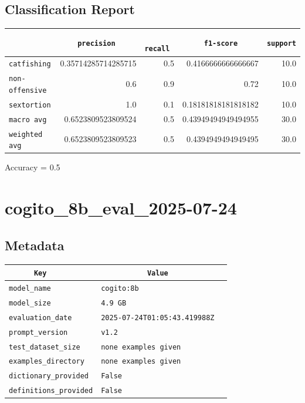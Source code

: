 \documentclass{article}
\begin{document}
\subsection{Classification Report}

\begin{center}
\begin{tabular}{l | r | r | r | r} \hline
    \verb|            | & \verb|    precision     | & \verb|      recall      | & \verb|     f1-score     | & \verb|support| \\ \hline
    \hline
    \verb|catfishing | & 0.35714285714285715 & 0.5 & 0.4166666666666667 &    10.0 \\ \hline
    \verb|non-offensive| & 0.6 & 0.9 & 0.72 &    10.0 \\ \hline
    \verb|sextortion | & 1.0 & 0.1 & 0.18181818181818182 &    10.0 \\ \hline
    \verb|macro avg  | & 0.6523809523809524 & 0.5 & 0.43949494949494955 &    30.0 \\ \hline
    \verb|weighted avg| & 0.6523809523809523 & 0.5 & 0.4394949494949495 &    30.0 \\ \hline
\end{tabular}
\end{center}

\begin{center}
Accuracy = 0.5
\end{center}

\section{cogito\_8b\_eval\_2025-07-24}
\subsection{Metadata}

\begin{center}
\begin{tabular}{l | l} \hline
    \verb|      Key      | & \verb|           Value           | \\ \hline
    \hline
    \verb|model_name    | & \verb|cogito:8b                    | \\ \hline
    \verb|model_size    | & \verb|4.9 GB                       | \\ \hline
    \verb|evaluation_date| & \verb|2025-07-24T01:05:43.419988Z  | \\ \hline
    \verb|prompt_version| & \verb|v1.2                         | \\ \hline
    \verb|test_dataset_size| & \verb|none examples given          | \\ \hline
    \verb|examples_directory| & \verb|none examples given          | \\ \hline
    \verb|dictionary_provided| & \verb|False                        | \\ \hline
    \verb|definitions_provided| & \verb|False                        | \\ \hline
\end{tabular}
\end{center}
\end{document}

